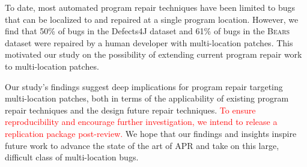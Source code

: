 \documentclass[10pt, conference]{IEEEtran}
\newcommand\todo[1]{\textcolor{red}{#1}}
\newcommand\bears{\textsc{Bears}\xspace}
\begin{document}
To date, most automated program repair techniques have been limited to bugs that
can be localized to and repaired at a single program location. However, we find
that 50\% of bugs in the Defects4J dataset and 61\% of bugs in the \bears dataset
were repaired by a human developer with multi-location patches. This motivated
our study on the possibility of extending current program repair work to
multi-location patches.

Our study's findings suggest deep implications for program repair targeting
multi-location patches, both in terms of the applicability of existing program
repair techniques and the design future repair techniques. \todo{To ensure
reproducibility and encourage further investigation, we intend to release a
replication package post-review.}
We hope that our findings and insights inspire future work to advance 
the state of the art of APR and take on this large, difficult class of 
multi-location bugs.



\end{document}
